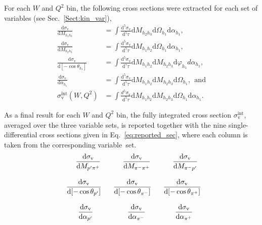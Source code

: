 \documentclass[prc,twocolumn,superscriptaddress,showpacs,amssymb,amsmath,amsfonts,aps,nofootinbib]{revtex4-1}
\begin{document}
For each $W$ and $Q^{2}$ bin, the following cross sections were extracted for each set of variables (see Sec.\!~\ref{Sect:kin_var}),
\begin{equation}
\begin{aligned}
\frac{\textrm{d}\sigma_{\text{v}}}{\textrm{d}M_{h_{1}h_{2}}} & =\int\frac{\textrm{d}^{5}\sigma_{\text{v}}}{\textrm{d}^{5}\tau}\textrm{d}M_{h_{2}h_{3}}\textrm{d}\Omega_{h_{1}}\textrm{d}\alpha_{h_{1}}, \\
\frac{\textrm{d}\sigma_{\text{v}}}{\textrm{d}M_{h_{2}h_{3}}} & =\int\frac{\textrm{d}^{5}\sigma_{\text{v}}}{\textrm{d}^{5}\tau}\textrm{d}M_{h_{1}h_{2}}\textrm{d}\Omega_{h_{1}}\textrm{d}\alpha_{h_{1}}, \\
\frac{\textrm{d}\sigma_{\text{v}}}{\textrm{d}[-\cos\theta_{h_{1}}]} & =\int\frac{\textrm{d}^{5}\sigma_{\text{v}}}{\textrm{d}^{5}\tau}\textrm{d}M_{h_{1}h_{2}}\textrm{d}M_{h_{2}h_{3}}\textrm{d}\varphi_{h_{1}}d\alpha_{h_{1}}, \\
\frac{\textrm{d}\sigma_{\text{v}}}{\textrm{d}\alpha_{h_{1}}} & =\int\frac{\textrm{d}^{5}\sigma_{\text{v}}}{\textrm{d}^{5}\tau}\textrm{d}M_{h_{1}h_{2}}\textrm{d}M_{h_{2}h_{3}}\textrm{d}\Omega_{h_{1}},~~\text{and}\\
\sigma_{\text{v}}^{\text{int}} (W, Q^{2}) &= \int \frac{d^{5}\sigma_{\text{v}}}{\textrm{d}^{5}\tau}\textrm{d}M_{h_{1}h_{2}}\textrm{d}M_{h_{2}h_{3}}\textrm{d}\Omega_{h_{1}}\textrm{d}\alpha_{h_{1}}.
\end{aligned}
\label{inegr5diff}
\end{equation}



As a final result for each $W$ and $Q^{2}$ bin, the fully integrated cross section $\sigma_{\text{v}}^{\text{int}}$, averaged over the three variable sets, is reported together with the nine single-differential cross sections given in Eq.\!~\eqref{eq:reported_sec}, where each column is taken from the corresponding variable~set.
\begin{equation}
\begin{aligned}
&~~~~~~\frac{\textrm{\textrm{d}}\sigma_{\text{v}}}{\textrm{d}M_{p'\pi^{+}}}&&~~~~~~\frac{\textrm{d}\sigma_{\text{v}}}{\textrm{d}M_{\pi^{-}\pi^{+}}}&&~~~~~~\frac{\textrm{d}\sigma_{\text{v}}}{\textrm{d}M_{\pi^{-}p'}}\\[8pt] 
&~~\frac{\textrm{d}\sigma_{\text{v}}}{\textrm{d}[-\cos\theta_{p'}]}&&~~\frac{\textrm{d}\sigma_{\text{v}}}{\textrm{d}[-\cos\theta_{\pi^{-}}]}&&~~\frac{\textrm{d}\sigma_{\text{v}}}{\textrm{d}[-\cos\theta_{\pi^{+}}]}\\[8pt] 
&~~~~~~~\frac{\textrm{d}\sigma_{\text{v}}}{\textrm{d}\alpha_{p'}}&&~~~~~~~~\frac{\textrm{d}\sigma_{\text{v}}}{\textrm{d}\alpha_{\pi^{-}}}&&~~~~~~~\frac{\textrm{d}\sigma_{\text{v}}}{\textrm{d}\alpha_{\pi^{+}}}
\end{aligned}
\label{eq:reported_sec}
\end{equation}
\end{document}

